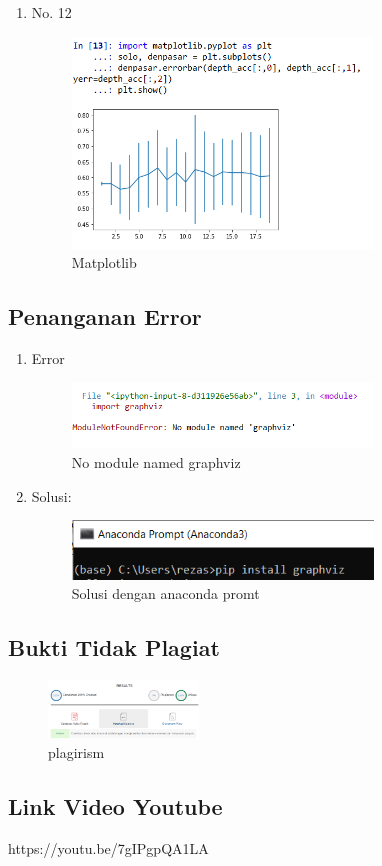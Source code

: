 \begin{enumerate}
\item No. 12
	\hfill\\
	
\begin{figure}[H]
    \includegraphics[width=8cm]{figures/1174084/2/praktek/12.png}
    \centering
    \caption{Matplotlib}
\end{figure}
\end{enumerate}

\subsection{Penanganan Error}
\begin{enumerate}
\item Error
\begin{figure}[H]
    \includegraphics[width=8cm]{figures/1174084/2/error/1.png}
    \centering
    \caption{No module named graphviz}
\end{figure}
\item Solusi: 
	\begin{figure}[H]
    \includegraphics[width=8cm]{figures/1174084/2/error/2.png}
    \centering
    \caption{Solusi dengan anaconda promt}
	\end{figure}

\end{enumerate}

\subsection{Bukti Tidak Plagiat}
\begin{figure}[H]
	\includegraphics[width=4cm]{figures/1174084/2/plagiarism.png}
	\centering
	\caption{plagirism}
\end{figure}


\subsection{Link Video Youtube}
https://youtu.be/7gIPgpQA1LA
